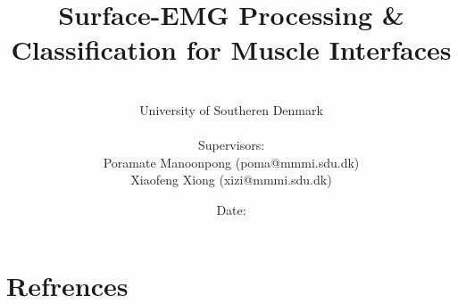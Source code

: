 \documentclass[a4paper, 12pt]{article}
\title{Surface-EMG Processing \& Classification for Muscle Interfaces}
\author{
\\University of Southeren Denmark
\\
\\Supervisors: 
\\Poramate Manoonpong (poma@mmmi.sdu.dk)
\\Xiaofeng Xiong (xizi@mmmi.sdu.dk)
}
\date{Date: }
\begin{document}
\maketitle
\newpage


\newpage


\newpage


\newpage

\tableofcontents
\newpage


\newpage

\newpage

\newpage

\newpage

\newpage

\newpage

\newpage


\listoffigures
\listoftables
\newpage

\section{Refrences}
%

\end{document}
